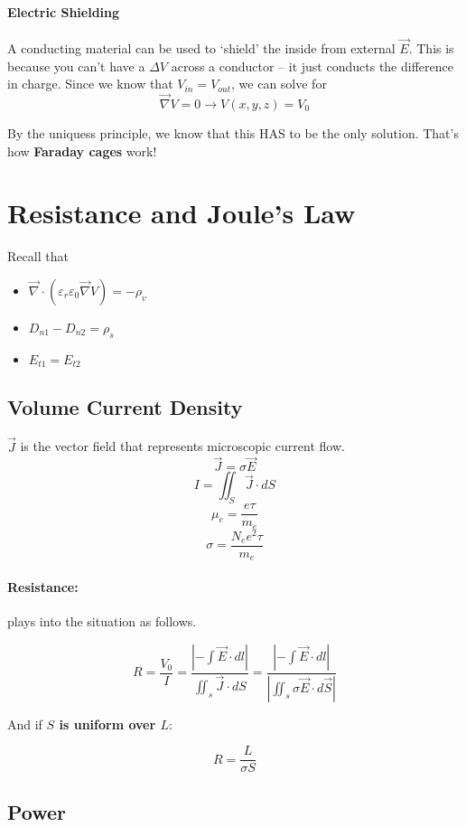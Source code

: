 \documentclass[a4paper,12pt]{report}
\begin{document}
\paragraph{Electric Shielding}

A conducting material can be used to `shield' the inside from external $\vec{E}$. This is because you can't have a $\Delta V$ across a conductor -- it just conducts the 
difference in charge. Since we know that $V_{in} = V_{out}$, we can solve for $$\vec{\nabla}V = 0 \to V(x, y, z) = V_0$$

By the uniquess principle, we know that this HAS to be the only solution. That's how \textbf{Faraday cages} work!


\section{Resistance and Joule's Law}

Recall that
\begin{itemize}
\item $\vec{\nabla} \cdot (\varepsilon_r \varepsilon_0 \vec{\nabla} V) = -\rho_v$
\item $D_{n1} - D_{n2} = \rho_s$
\item $E_{t1} = E_{t2}$
\end{itemize}

\subsection{Volume Current Density}

$\vec{J}$ is the vector field that represents microscopic current flow. $$\vec{J} = \sigma \vec{E}$$
$$I = \iint_S \vec{J} \cdot dS$$
$$\mu_e = \frac{e \tau}{m_e}$$
$$\sigma = \frac{N_e e^2 \tau}{m_e}$$

\paragraph{Resistance: } plays into the situation as follows.

$$R = \frac{V_0}{I} = \frac{|-\int \vec{E}\cdot dl|}{\iint_s \vec{J} \cdot dS} = \frac{|-\int \vec{E}\cdot dl|}{|\iint_s \sigma \vec{E} \cdot d\vec{S}|}$$

And if \textbf{$S$ is uniform over $L$}: 

$$R = \frac{L}{\sigma S}$$


\subsection{Power}
\end{document}
